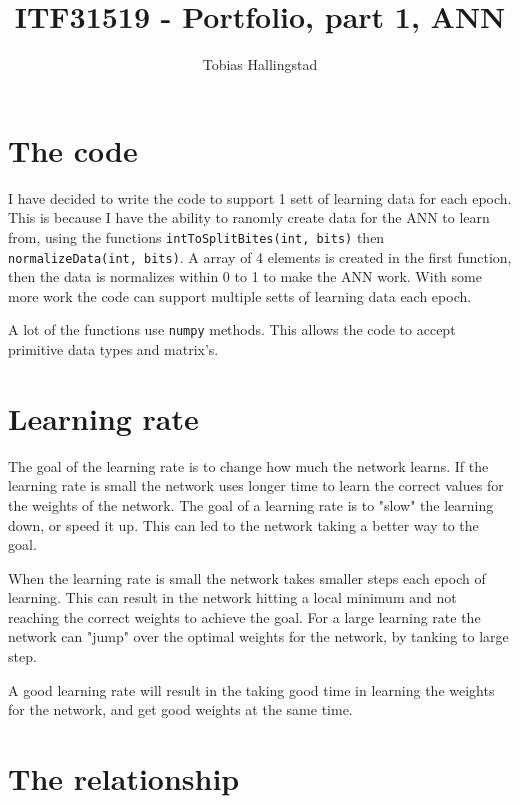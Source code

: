 \documentclass[10pt]{article}
\title{ITF31519 - Portfolio, part 1, ANN}
\author{Tobias Hallingstad}
\begin{document}
    \begin{titlepage}
        \maketitle
    \end{titlepage}


    \section{The code}
    I have decided to write the code to support 1 sett of learning data for each epoch. This is because I have the ability to ranomly create data for the ANN to learn from, using the functions \texttt{intToSplitBites(int, bits)} then \texttt{normalizeData(int, bits)}. A array of 4 elements is created in the first function, then the data is normalizes within 0 to 1 to make the ANN work. With some more work the code can support multiple setts of learning data each epoch.

    A lot of the functions use \texttt{numpy} methods. This allows the code to accept primitive data types and matrix's. 


    \section{Learning rate}
    The goal of the learning rate is to change how much the network learns. If the learning rate is small the network uses longer time to learn the correct values for the weights of the network. The goal of a learning rate is to "slow" the learning down, or speed it up. This can led to the network taking a better way to the goal.

    When the learning rate is small the network takes smaller steps each epoch of learning. This can result in the network hitting a local minimum and not reaching the correct weights to achieve the goal. For a large learning rate the network can "jump" over the optimal weights for the network, by tanking to large step.

    A good learning rate will result in the taking good time in learning the weights for the network, and get good weights at the same time.

    \section{The relationship}
\end{document}

